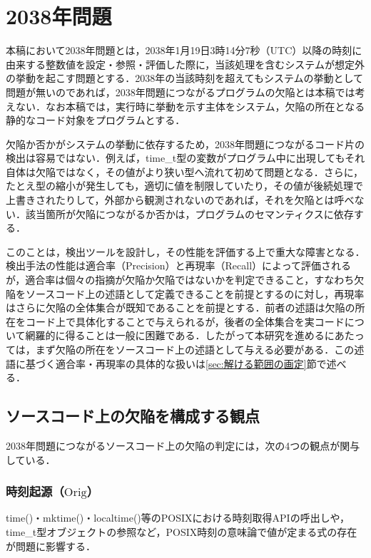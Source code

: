 \documentclass[submit,techrep,noauthor]{ipsj-lualatex}
\begin{document}
\section{2038年問題}

本稿において2038年問題とは，2038年1月19日3時14分7秒（UTC）以降の時刻に由来する整数値を設定・参照・評価した際に，当該処理を含むシステムが想定外の挙動を起こす問題とする．2038年の当該時刻を超えてもシステムの挙動として問題が無いのであれば，2038年問題につながるプログラムの欠陥とは本稿では考えない．なお本稿では，実行時に挙動を示す主体をシステム，欠陥の所在となる静的なコード対象をプログラムとする．

欠陥か否かがシステムの挙動に依存するため，2038年問題につながるコード片の検出は容易ではない．例えば，time\_t型の変数がプログラム中に出現してもそれ自体は欠陥ではなく，その値がより狭い型へ流れて初めて問題となる．さらに，たとえ型の縮小が発生しても，適切に値を制限していたり，その値が後続処理で上書きされたりして，外部から観測されないのであれば，それを欠陥とは呼べない．該当箇所が欠陥につながるか否かは，プログラムのセマンティクスに依存する．

このことは，検出ツールを設計し，その性能を評価する上で重大な障害となる．検出手法の性能は適合率（Precision）と再現率（Recall）によって評価されるが，適合率は個々の指摘が欠陥か欠陥ではないかを判定できること，すなわち欠陥をソースコード上の述語として定義できることを前提とするのに対し，再現率はさらに欠陥の全体集合が既知であることを前提とする．前者の述語は欠陥の所在をコード上で具体化することで与えられるが，後者の全体集合を実コードについて網羅的に得ることは一般に困難である．したがって本研究を進めるにあたっては，まず欠陥の所在をソースコード上の述語として与える必要がある．この述語に基づく適合率・再現率の具体的な扱いは\ref{sec:解ける範囲の画定}節で述べる．

\subsection{ソースコード上の欠陥を構成する観点}

2038年問題につながるソースコード上の欠陥の判定には，次の4つの観点が関与している．

\subsubsection{時刻起源（$\mathrm{Orig}$）}

time()・mktime()・localtime()等のPOSIX\cite{ref1}における時刻取得APIの呼出しや，time\_t型オブジェクトの参照など，POSIX時刻の意味論で値が定まる式の存在が問題に影響する．
\end{document}
